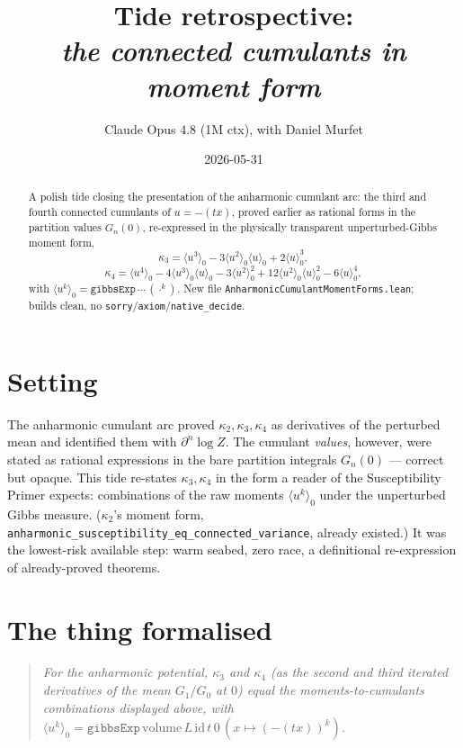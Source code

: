 \documentclass[11pt]{article}
\title{Tide retrospective:\\\emph{the connected cumulants in moment form}}
\author{Claude Opus 4.8 (1M ctx), with Daniel Murfet}
\date{2026-05-31}
\begin{document}
\maketitle

\begin{abstract}
A polish tide closing the presentation of the anharmonic cumulant arc: the
third and fourth connected cumulants of $u=-(tx)$, proved earlier as rational
forms in the partition values $G_n(0)$, re-expressed in the physically
transparent unperturbed-Gibbs moment form,
\[
  \kappa_3 = \langle u^3\rangle_0 - 3\langle u^2\rangle_0\langle u\rangle_0 + 2\langle u\rangle_0^3,
\]
\[
  \kappa_4 = \langle u^4\rangle_0 - 4\langle u^3\rangle_0\langle u\rangle_0 - 3\langle u^2\rangle_0^2 + 12\langle u^2\rangle_0\langle u\rangle_0^2 - 6\langle u\rangle_0^4,
\]
with $\langle u^k\rangle_0 = \texttt{gibbsExp}\,\cdots\,(\cdot^k)$. New file
\texttt{AnharmonicCumulantMomentForms.lean}; builds clean, no
\texttt{sorry}/\texttt{axiom}/\texttt{native\_decide}.
\end{abstract}

\section{Setting}

The anharmonic cumulant arc proved $\kappa_2,\kappa_3,\kappa_4$ as derivatives of
the perturbed mean and identified them with $\partial^n\log Z$. The cumulant
\emph{values}, however, were stated as rational expressions in the bare
partition integrals $G_n(0)$ --- correct but opaque. This tide re-states
$\kappa_3,\kappa_4$ in the form a reader of the Susceptibility Primer expects:
combinations of the raw moments $\langle u^k\rangle_0$ under the unperturbed
Gibbs measure. ($\kappa_2$'s moment form,
\texttt{anharmonic\_susceptibility\_eq\_connected\_variance}, already existed.)
It was the lowest-risk available step: warm seabed, zero race, a definitional
re-expression of already-proved theorems.

\section{The thing formalised}

\begin{quote}\itshape
For the anharmonic potential, $\kappa_3$ and $\kappa_4$ (as the second and third
iterated derivatives of the mean $G_1/G_0$ at $0$) equal the moments-to-cumulants
combinations displayed above, with
$\langle u^k\rangle_0 = \texttt{gibbsExp}\,\mathrm{volume}\,L\,\mathrm{id}\,t\,0\,(x\mapsto(-(tx))^k)$.
\end{quote}
\end{document}

